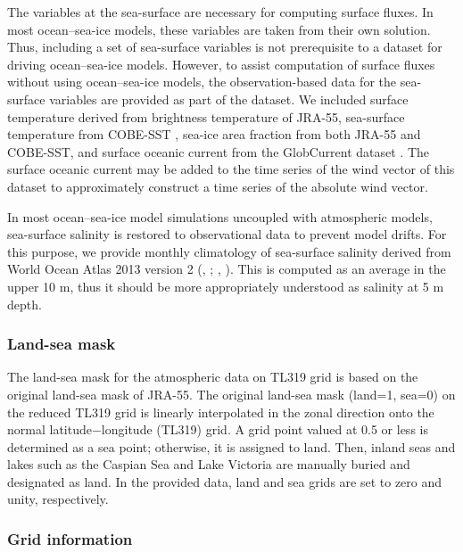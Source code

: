 \documentclass[dvipdfmx]{elsarticle_mod}
\begin{document}
The variables at the sea-surface are necessary for computing surface fluxes. In most ocean--sea-ice models, these variables are taken from their own solution. Thus, including a set of sea-surface variables is not prerequisite to a dataset for driving ocean--sea-ice models. However, to assist computation of surface fluxes without using ocean--sea-ice models, the observation-based data for the sea-surface variables are provided as part of the dataset. We included surface temperature derived from brightness temperature of JRA-55, sea-surface temperature from COBE-SST \citep{Ishii_et_al_2005}, sea-ice area fraction from both JRA-55 and COBE-SST, and surface oceanic current from the GlobCurrent dataset \citep{Rio_et_al_2014}. The surface oceanic current may be added to the time series of the wind vector of this dataset to approximately construct a time series of the absolute wind vector.

In most ocean--sea-ice model simulations uncoupled with atmospheric models, sea-surface salinity is restored to observational data to prevent model drifts. For this purpose, we provide monthly climatology of sea-surface salinity derived from World Ocean Atlas 2013 version 2 (\citeauthor{Zweng_et_al_2013}, \citeyear{Zweng_et_al_2013}; \citeauthor{Boyer_et_al_2015}, \citeyear{Boyer_et_al_2015}). This is computed as an average in the upper 10 m, thus it should be more appropriately understood as salinity at 5 m depth.


\subsubsection{Land-sea mask}

The land-sea mask for the atmospheric data on TL319 grid is based on the original land-sea mask of JRA-55. The original land-sea mask (land=1, sea=0) on the reduced TL319 grid is linearly interpolated in the zonal direction onto the normal latitude$-$longitude (TL319) grid. A grid point valued at 0.5 or less is determined as a sea point; otherwise, it is assigned to land. Then, inland seas and lakes such as the Caspian Sea and Lake Victoria are manually buried and designated as land. In the provided data, land and sea grids are set to zero and unity, respectively.


\subsubsection{Grid information}
\end{document}
